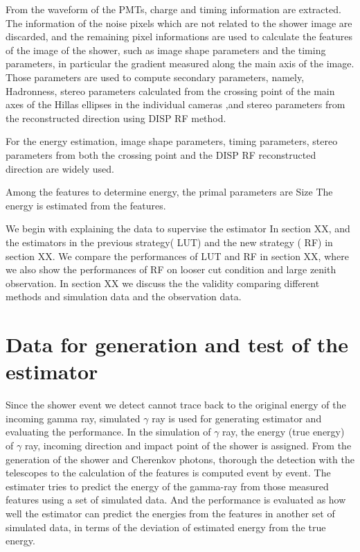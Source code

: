 \documentclass[preprint,12pt,authoryear]{elsarticle}
\begin{document}
From the waveform of the PMTs, charge and timing information are extracted.
The information of the noise pixels which are not related to the shower image are discarded, and the remaining pixel informations are used to calculate the features of the image of the shower, such as image shape parameters and the timing parameters, in particular the gradient measured along the main axis of the image. Those parameters are used to compute secondary parameters, namely, Hadronness, stereo parameters calculated from the crossing point of the main axes of the Hillas ellipses in the individual cameras ,and stereo parameters from the reconstructed direction using DISP RF method.

For the energy estimation,  image shape parameters, timing parameters, stereo parameters from both the crossing point and the DISP RF reconstructed direction are widely used.

Among the features to determine energy, the primal parameters are Size 
The energy is estimated from the features. 

We begin with explaining the data to supervise the estimator In section XX, and the estimators in the previous strategy( LUT) and the new strategy ( RF) in section XX.
We compare the performances of LUT and RF in section XX, where we also show the performances of RF on looser cut condition and large zenith observation.
In section XX we discuss the the validity comparing different methods and simulation data and the observation data.


\section{Data for generation and test of the estimator}
Since the shower event we detect cannot trace back to the original energy of the incoming gamma ray, simulated $\gamma$ ray is used for generating estimator and evaluating the performance. In the simulation of  $\gamma$ ray, the energy (true energy) of $\gamma$ ray, incoming direction and impact point of the shower is assigned. From the generation of the shower and  Cherenkov photons, thorough the detection with the telescopes to the calculation of the features is computed event by event. The estimater tries to predict the energy of the gamma-ray from those measured features using a set of simulated data. And the performance is evaluated as how well the estimator can predict the energies from the features in another set of simulated data, in terms of the deviation of estimated energy from the true energy.
\end{document}
